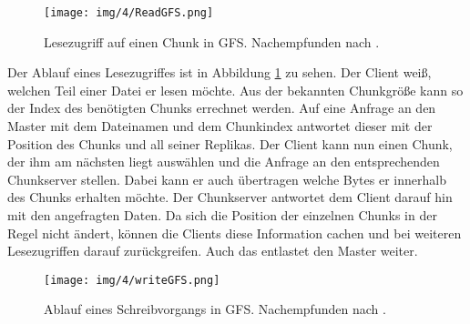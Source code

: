 \documentclass[12pt,oneside,a4paper,parskip]{scrbook}
\begin{document}
\begin{figure}[htb]
  \centering
  \texttt{[image: img/4/ReadGFS.png]}
  \caption[Lesezugriff auf einen Chunk in GFS]{Lesezugriff auf einen Chunk in GFS. Nachempfunden nach \cite{GFS}.}
  \label{readgfs}
\end{figure}

Der Ablauf eines Lesezugriffes ist in Abbildung \ref{readgfs} zu sehen. Der Client weiß, welchen Teil einer Datei er lesen möchte. Aus der bekannten Chunkgröße kann so der Index des benötigten Chunks errechnet werden. Auf eine Anfrage an den Master mit dem Dateinamen und dem Chunkindex antwortet dieser mit der Position des Chunks und all seiner Replikas. Der Client kann nun einen Chunk, der ihm am nächsten liegt auswählen und die Anfrage an den entsprechenden Chunkserver stellen. Dabei kann er auch übertragen welche Bytes er innerhalb des Chunks erhalten möchte. Der Chunkserver antwortet dem Client darauf hin mit den angefragten Daten. Da sich die Position der einzelnen Chunks in der Regel nicht ändert, können die Clients diese Information cachen und bei weiteren Lesezugriffen darauf zurückgreifen. Auch das entlastet den Master weiter.

\begin{figure}[htb]
  \centering
  \texttt{[image: img/4/writeGFS.png]}
  \caption[Schreiben eines Chunks in GFS]{Ablauf eines Schreibvorgangs in GFS. Nachempfunden nach \cite{GFS}.}
  \label{writeGFS}
\end{figure}
\end{document}
